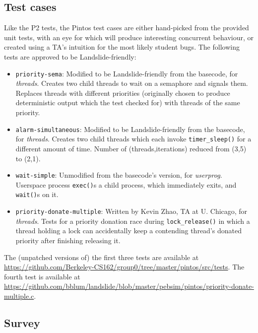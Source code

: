 \subsection{Test cases}
\label{sec:education-pintos-tests}

Like the P2 tests, the Pintos test cases are either hand-picked from the provided unit tests,
with an eye for which will produce interesting concurrent behaviour,
or created using a TA's intuition for the most likely student bugs.
The following tests are approved to be Landslide-friendly:

\begin{itemize}
	\item {\tt priority-sema}:
		Modified to be Landslide-friendly from the basecode, for {\em threads}.
		Creates two child threads to wait on a semaphore and signals them.
		Replaces threads with different priorities
		(originally chosen to produce deterministic output which the test checked for)
		with threads of the same priority.
	\item {\tt alarm-simultaneous}:
		Modified to be Landslide-friendly from the basecode, for {\em threads}.
		Creates two child threads which each invoke {\tt timer\_sleep()} for a different amount of time.
		Number of (threads,iterations) reduced from (3,5) to (2,1).
	\item {\tt wait-simple}:
		Unmodified from the basecode's version, for {\em userprog}.
		Userspace process {\tt exec()}s a child process, which immediately exits, and {\tt wait()}s on it.
	\item {\tt priority-donate-multiple}:
		Written by Kevin Zhao, TA at U. Chicago, for {\em threads}.
		Tests for a priority donation race during {\tt lock\_release()}
		in which a thread holding a lock can accidentally keep a contending thread's donated priority
		after finishing releasing it.
\end{itemize}
\vspace{1em}

The (unpatched versions of) the first three tests are available at
\url{https://github.com/Berkeley-CS162/group0/tree/master/pintos/src/tests}.
The fourth test is available at
\url{https://github.com/bblum/landslide/blob/master/pebsim/pintos/priority-donate-multiple.c}.

\subsection{Survey}
\label{sec:education-survey-pintos}

